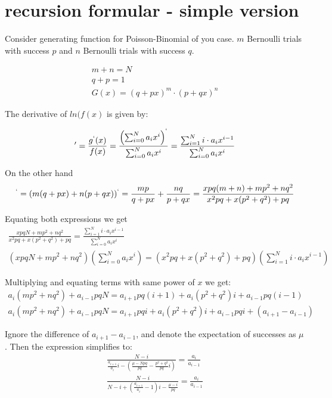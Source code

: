 \documentclass[11pt,draft]{article}
\title{}
\author{Maxim Zhilyaev \and David Zeber}
\begin{document}
\maketitle

\section{recursion formular - simple version}

Consider generating function for Poisson-Binomial of you case.  $m$ Bernoulli trials with success $p$ and $n$ Bernoulli trials with success $q$. 

\begin{align}
m+n = N \\
q+p = 1 \\
G(x) = (q+px)^m \cdot (p+qx)^n
\end{align}

The derivative of $ln(f(x)$ is given by:

\begin{align}
[ln(g(x))]' = \frac{g^`(x)}{f(x)} = \frac{\left ( \sum_{i=0}^{N} a_i x^i \right )^`}{ \sum_{i=0}^{N} a_i x^i} = \frac{\sum_{i=1}^{N} i \cdot a_i x^{i-1}}{  \sum_{i=0}^{N} a_i x^i}
\end{align}

On the other hand
\begin{align}
[ln(g(x_)]^` = (m(q+px) + n(p+qx))^` = \frac{mp}{q+px} + \frac{nq}{p+qx} = \frac{xpq(m+n) + mp^2 + nq^2}{x^2pq + x(p^2 + q^2) + pq}
\end{align}

Equating both expressions we get
\begin{align}
\frac{xpqN + mp^2 + nq^2}{x^2pq + x(p^2 + q^2) + pq} = \frac{\sum_{i=1}^{N} i \cdot a_i x^{i-1}}{  \sum_{i=0}^{N} a_i x^i} \\
(xpqN + mp^2 + nq^2)(\sum_{i=0}^{N} a_i x^i) = (x^2pq + x(p^2 + q^2) + pq)(\sum_{i=1}^{N} i \cdot a_i x^{i-1})
\end{align}

Multiplying and equating terms with same power of $x$ we get:
\begin{align}
a_i(mp^2 + nq^2) + a_{i-1}pqN = a_{i+1}pq(i+1) + a_i(p^2 + q^2)i + a_{i-1}pq(i-1) \\
a_i(mp^2 + nq^2) + a_{i-1}pqN = a_{i+1}pqi + a_i(p^2 + q^2)i + a_{i-1}pqi  + (a_{i+1} - a_{i-1})
\end{align}

Ignore the difference of $a_{i+1} - a_{i-1}$, and denote the expectation of successes as $\mu$. Then the expression simplifies to:
\begin{align}
\frac{   N - i}{ \frac{ a_{i+1}}{a_i}i    - (\frac{\mu - Npq}{pq} - \frac{p^2 + q^2}{pq}i)   } =  \frac{a_{i}}{a_{i-1}} \\
\frac{   N - i}{ N - i  + (\frac{ a_{i+1}}{a_i} - 1)i   - \frac{\mu - i}{pq}   } =  \frac{a_{i}}{a_{i-1}} \\
\end{align}
\end{document}
